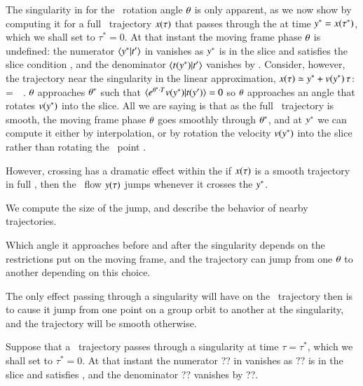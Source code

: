 The singularity in  for the \mframes\ rotation
angle ${\bf \theta}$ is only apparent, as we now show by computing it for a
full \statesp\ trajectory $x(\tau)$ that passes through the {\sset}
 at time $y^* =x(\tau^*)$, which we shall set
to  $\tau^*=0$. At that instant the moving frame phase ${\bf \theta}$ is
undefined: the numerator $\braket{\sspRSing}{\sliceTan{}}$ in
 vanishes as $y^*$ is in the slice and
satisfies the slice condition , and the denominator
${\braket{\groupTan_{}(\sspRSing)}{\sliceTan{}}}$ vanishes by
. Consider, however, the trajectory near the
singularity in the linear approximation,
$x(\tau)\simeq y^*+v(y^*)\, \tau$:
\beq
{}
       {}
    =  \, \tau
\,.
${\bf \theta}$ approaches ${\bf \theta}^*$ such that $\braket{e^{\gSpace^* \cdot
\Lg}\vel(\sspRSing)}{\groupTan(\slicep)}= 0$ so ${\bf \theta}$ approaches an
angle that rotates $v(y^*)$ into the slice.
All we are saying is
	\ifboyscout
{}
	\else
that as the full \statesp\ trajectory is smooth, the moving frame phase
${\bf \theta}$ goes smoothly through ${\bf \theta}^*$, and at $y^*$ we can
compute it either by interpolation, or by rotation the velocity
$v(y^*)$ into the slice rather than rotating the \statesp\ point
\ssp.
	\fi

However, {\sset} crossing has a dramatic effect within the \reducedsp\: if
$x(\tau)$ is a smooth trajectory in full {\statesp}, then the
\reducedsp\ flow $y(\tau)$ jumps whenever it crosses the {\sset}
$y^*$.

We compute the size of the jump, and describe the behavior of nearby
trajectories.

Which angle it approaches before and after the singularity depends on the
restrictions put on the moving frame, and the trajectory can jump from
one ${\bf \theta}$ to another depending on this choice.

The only
effect passing through a singularity will have on the \reducedsp\
trajectory then is to cause it jump from one point on a group orbit to
another at the singularity, and the trajectory will be smooth otherwise.



Suppose that a \reducedsp\ trajectory passes through a singularity at
time $\tau=\tau^*$, which we shall set to  $\tau^*=0$. At that instant
the numerator ?? in vanishes as $??$ is in the slice and satisfies
\refeq{eq:slicecondition} , and the denominator ?? vanishes by ??.

